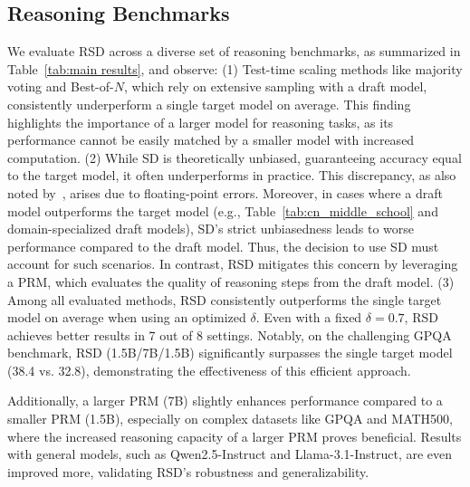 \documentclass{article}
\theoremstyle{plain}
\theoremstyle{definition}
\theoremstyle{remark}
\begin{document}
\subsection{Reasoning Benchmarks}

We evaluate RSD across a diverse set of reasoning benchmarks, as summarized in Table~\ref{tab:main results}, and observe: (1) Test-time scaling methods like majority voting and Best-of-$N$, which rely on extensive sampling with a draft model, consistently underperform a single target model on average. This finding highlights the importance of a larger model for reasoning tasks, as its performance cannot be easily matched by a smaller model with increased computation. (2) While SD is theoretically unbiased, guaranteeing accuracy equal to the target model, it often underperforms in practice. This discrepancy, as also noted by~\citet{chen2023accelerating}, arises due to floating-point errors. Moreover, in cases where a draft model outperforms the target model (e.g., Table~\ref{tab:cn_middle_school} and domain-specialized draft models), SD's strict unbiasedness leads to worse performance compared to the draft model. Thus, the decision to use SD must account for such scenarios. In contrast, RSD mitigates this concern by leveraging a PRM, which evaluates the quality of reasoning steps from the draft model. (3) Among all evaluated methods, RSD consistently outperforms the single target model on average when using an optimized $\delta$. Even with a fixed $\delta=0.7$, RSD achieves better results in 7 out of 8 settings. Notably, on the challenging GPQA benchmark, RSD (1.5B/7B/1.5B) significantly surpasses the single target model (38.4 vs. 32.8), demonstrating the effectiveness of this efficient approach.

Additionally, a larger PRM (7B) slightly enhances performance compared to a smaller PRM (1.5B), especially on complex datasets like GPQA and MATH500, where the increased reasoning capacity of a larger PRM proves beneficial. Results with general models, such as Qwen2.5-Instruct and Llama-3.1-Instruct, are even improved more, validating RSD’s robustness and generalizability.

\end{document}
